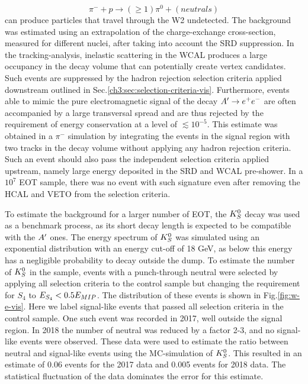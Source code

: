 \begin{equation}
  \label{eq:vis-int-neutral}
  \pi^- + p \rightarrow (\geq 1)\pi^0 + (neutrals)
\end{equation}
can produce particles that travel through the W2 undetected. The background was estimated using an extrapolation of the charge-exchange cross-section, measured for different nuclei, after taking into account the SRD suppression. In the tracking-analysis, inelastic scattering in the WCAL produces a large occupancy in the decay volume that can potentially create vertex candidates. Such events are suppressed by the hadron rejection selection criteria applied downstream outlined in Sec.\ref{ch3:sec:selection-criteria-vis}. Furthermore, events able to mimic the pure electromagnetic signal of the decay $A' \rightarrow e^+ e^-$ are often accompanied by a large transversal spread and are thus rejected by the requirement of energy conservation at a level of $\lesssim 10^{-5}$. This estimate was obtained in a $\pi^-$ simulation by integrating the events in the signal region with two tracks in the decay volume without applying any hadron rejection criteria. Such an event should also pass the independent selection criteria applied upstream, namely large energy deposited in the SRD and WCAL pre-shower. In a $10^7$ EOT sample, there was no event with such signature even after removing the HCAL and VETO from the selection criteria.

To estimate the background for a larger number of EOT, the $K^0_S$ decay was used as a benchmark process, as its short decay length is expected to be compatible with the $A'$ ones. The energy spectrum of $K^0_S$ was simulated using an exponential distribution with an energy cut-off of 18 GeV, as below this energy has a negligible probability to decay outside the dump. To estimate the number of $K^0_S$ in the sample, events with a punch-through neutral were selected by applying all selection criteria to the control sample but changing the requirement for $S_4$ to $E_{S_4} < 0.5 E_{MIP}$. The distribution of these events is shown in Fig.\ref{fig:w-e-vis}. Here we label signal-like events that passed all selection criteria in the control sample. One such event was recorded in 2017, well outside the signal region. In 2018 the number of neutral was reduced by a factor 2-3, and no signal-like events were observed. These data were used to estimate the ratio between neutral and signal-like events using the MC-simulation of $K^0_S$. This resulted in an estimate of 0.06 events for the 2017 data and 0.005 events for 2018 data. The statistical fluctuation of the data dominates the error for this estimate.


